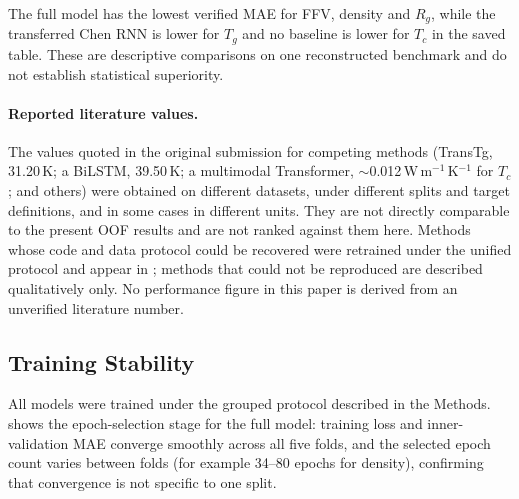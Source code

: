 \documentclass{article}
\begin{document}
The full model has the lowest verified MAE for FFV, density and $R_g$, while the transferred Chen RNN is lower for $T_g$ and no baseline is lower for $T_c$ in the saved table. These are descriptive comparisons on one reconstructed benchmark and do not establish statistical superiority.

\paragraph{Reported literature values.} The values quoted in the original submission for competing methods (TransTg, 31.20\,K; a BiLSTM, 39.50\,K; a multimodal Transformer, $\sim$0.012\,W\,m$^{-1}$\,K$^{-1}$ for $T_c$; and others) were obtained on different datasets, under different splits and target definitions, and in some cases in different units. They are not directly comparable to the present OOF results and are not ranked against them here. Methods whose code and data protocol could be recovered were retrained under the unified protocol and appear in ; methods that could not be reproduced are described qualitatively only. No performance figure in this paper is derived from an unverified literature number.

\subsection{Training Stability}

All models were trained under the grouped protocol described in the Methods.  shows the epoch-selection stage for the full model: training loss and inner-validation MAE converge smoothly across all five folds, and the selected epoch count varies between folds (for example 34--80 epochs for density), confirming that convergence is not specific to one split.
\end{document}
